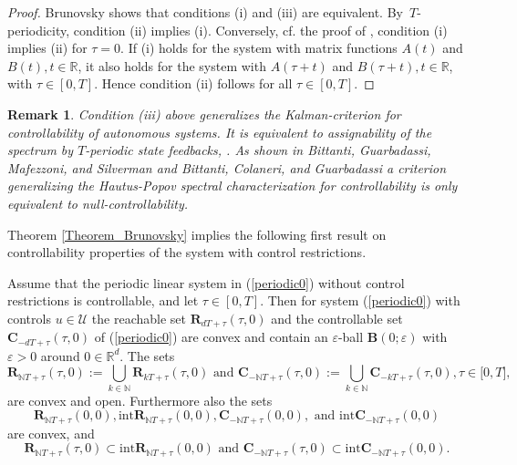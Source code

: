 \documentclass{siamltex}%
\newtheorem{remark}[theorem]{Remark}
\begin{document}
\begin{proof}
Brunovsky \cite[Proposition 3]{Brun} shows that conditions (i) and (iii) are
equivalent. By\ $T$-periodicity, condition (ii) implies (i). Conversely, cf.
the proof of \cite[Proposition 3]{Brun}, condition (i) implies (ii) for
$\tau=0$. If (i) holds for the system with matrix functions $A(t)$ and
$B(t),t\in\mathbb{R}$, it also holds for the system with $A(\tau+t)$ and
$B(\tau+t),t\in\mathbb{R}$, with $\tau\in\left[  0,T\right]  $. Hence
condition (ii) follows for all $\tau\in\left[  0,T\right]  $.
\end{proof}

\begin{remark}
Condition (iii) above generalizes the Kalman-criterion for controllability of
autonomous systems. It is equivalent to assignability of the spectrum by
$T$-periodic state feedbacks, \cite[Theorem on p. 302]{Brun}. As shown in
Bittanti, Guarbadassi, Mafezzoni, and Silverman \cite{Bit78} and Bittanti,
Colaneri, and Guarbadassi \cite{Bit84} a criterion generalizing the
Hautus-Popov spectral characterization for controllability is only equivalent
to null-controllability.
\end{remark}

Theorem \ref{Theorem_Brunovsky} implies the following first result on
controllability properties of the system with control restrictions.

\begin{proposition}
\label{proposition_R}Assume that the periodic linear system in
(\ref{periodic0}) without control restrictions is controllable, and let
$\tau\in\left[  0,T\right]  $. Then for system (\ref{periodic0}) with controls
$u\in\mathcal{U}$ the reachable set $\mathbf{R}_{dT+\tau}(\tau,0)$ and the
controllable set $\mathbf{C}_{-dT+\tau}(\tau,0)$ of (\ref{periodic0}) are
convex and contain an $\varepsilon$-ball $\mathbf{B}(0;\varepsilon)$ with
$\varepsilon>0$ around $0\in\mathbb{R}^{d}$. The sets%
\[
\mathbf{R}_{\mathbb{N}T+\tau}(\tau,0):=\bigcup_{k\in\mathbb{N}}\mathbf{R}%
_{kT+\tau}(\tau,0)\text{ and }\mathbf{C}_{-\mathbb{N}T+\tau}(\tau
,0):=\bigcup_{k\in\mathbb{N}}\mathbf{C}_{-kT+\tau}(\tau,0),\tau\in
\lbrack0,T],
\]
are convex and open. Furthermore also the sets%
\[
\mathbf{R}_{\mathbb{N}T+\tau}(0,0),\mathrm{int}\mathbf{R}_{\mathbb{N}T+\tau
}(0,0),\mathbf{C}_{-\mathbb{N}T+\tau}(0,0),\text{ and }\mathrm{int}%
\mathbf{C}_{-\mathbb{N}T+\tau}(0,0)
\]
are convex, and%
\[
\mathbf{R}_{\mathbb{N}T+\tau}(\tau,0)\subset\mathrm{int}\mathbf{R}%
_{\mathbb{N}T+\tau}(0,0)\text{ and }\mathbf{C}_{-\mathbb{N}T+\tau}%
(\tau,0)\subset\mathrm{int}\mathbf{C}_{-\mathbb{N}T+\tau}(0,0).
\]

\end{proposition}
\end{document}
